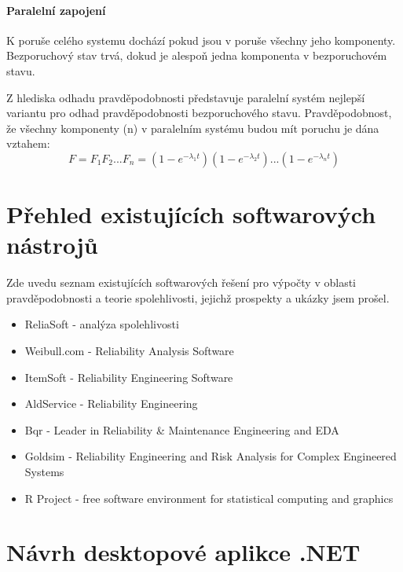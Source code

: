 \documentclass[FM,RP]{tulthesis}
\begin{document}
        \subsubsection*{Paralelní zapojení}
            K poruše celého systemu dochází pokud jsou v poruše všechny jeho komponenty. Bezporuchový stav trvá, dokud je alespoň jedna komponenta v bezporuchovém stavu.
            
            Z hlediska odhadu pravděpodobnosti představuje paralelní systém nejlepší variantu pro odhad pravděpodobnosti bezporuchového stavu. \cite{5}
            Pravděpodobnost, že všechny komponenty (n) v paralelním systému budou mít poruchu je dána vztahem:
            $$ F = F_{1}F_{2}...F_{n} = (1-e^{-\lambda_{1}t})(1-e^{-\lambda_{2}t})...(1-e^{-\lambda_{n}t}) $$



\chapter{Přehled existujících softwarových nástrojů}
    Zde uvedu seznam existujících softwarových řešení pro výpočty v oblasti pravděpodobnosti a teorie spolehlivosti, jejichž prospekty a ukázky jsem prošel.
    \begin{itemize} 
    \item ReliaSoft - analýza spolehlivosti \cite{8}
    \item Weibull.com - Reliability Analysis Software \cite{9}
    \item ItemSoft - Reliability Engineering Software \cite{10}
    \item AldService - Reliability Engineering \cite{11}
    \item Bqr - Leader in Reliability \& Maintenance Engineering and EDA \cite{12}
    \item Goldsim - Reliability Engineering and Risk Analysis for Complex Engineered Systems \cite{13}
    \item R Project - free software environment for statistical computing and graphics \cite{14}
    \end{itemize}

\chapter{Návrh desktopové aplikce .NET}
\end{document}
